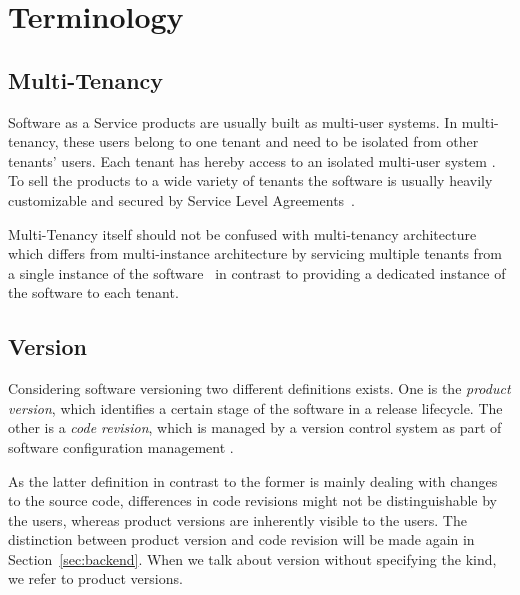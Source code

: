 \section{Terminology}
\label{sec:terminology}

\subsection{Multi-Tenancy}

Software as a Service products are usually built as multi-user systems. In multi-tenancy, these users belong to one tenant and need to be isolated from other tenants' users. Each tenant has hereby access to an isolated multi-user system \cite{Chong2006a}. To sell the products to a wide variety of tenants the software is usually heavily customizable and secured by Service Level Agreements~\cite{Bezemer2010}.

Multi-Tenancy itself should not be confused with multi-tenancy architecture which differs from multi-instance architecture by servicing multiple tenants from a single instance of the software~\cite{Shao2011} in contrast to providing a dedicated instance of the software to each tenant.

\subsection{Version}

Considering software versioning two different definitions exists. One is the \emph{product version}, which identifies a certain stage of the software in a release lifecycle. The other is a \emph{code revision}, which is managed by a version control system as part of software configuration management \cite{swebook}.

As the latter definition in contrast to the former is mainly dealing with changes to the source code, differences in code revisions might not be distinguishable by the users, whereas product versions are inherently visible to the users. The distinction between product version and code revision will be made again in Section~\ref{sec:backend}. When we talk about version without specifying the kind, we refer to product versions.

